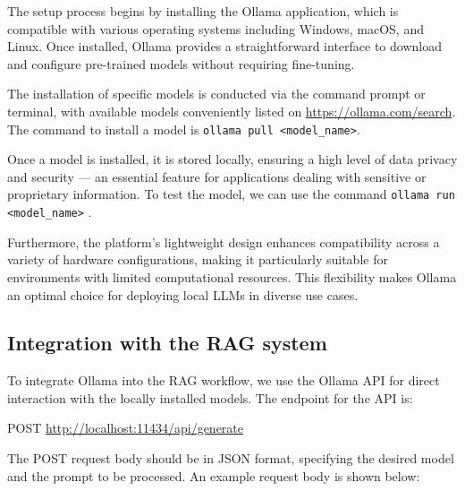 The setup process begins by installing the Ollama application, which is compatible with various operating systems including Windows, macOS, and Linux. Once installed, Ollama provides a straightforward interface to download and configure pre-trained models without requiring fine-tuning.

The installation of specific models is conducted via the command prompt or terminal, with available models conveniently listed on \url{https://ollama.com/search}.
The command to install a model is \verb|ollama pull <model_name>|.

Once a model is installed, it is stored locally, ensuring a high level of data privacy and security — an essential feature for applications dealing with sensitive or proprietary information. To test the model, we can use the command \verb|ollama run <model_name>| .

Furthermore, the platform's lightweight design enhances compatibility across a variety of hardware configurations, making it particularly suitable for environments with limited computational resources. This flexibility makes Ollama an optimal choice for deploying local LLMs in diverse use cases.









\subsection{Integration with the RAG system}

To integrate Ollama into the RAG workflow, we use the Ollama API for direct interaction with the locally installed models. The endpoint for the API is:

POST \url{http://localhost:11434/api/generate}

The POST request body should be in JSON format, specifying the desired model and the prompt to be processed. An example request body is shown below:

